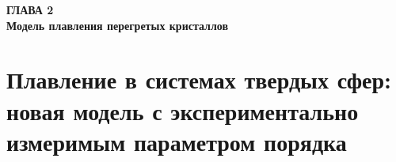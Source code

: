 
\newpage
\begin{center}
\textbf{\large ГЛАВА 2 \\ Модель плавления перегретых кристаллов}
\end{center}


\section{Плавление в системах твердых сфер: новая модель с экспериментально измеримым параметром порядка}
\label{ch2_sec3}


